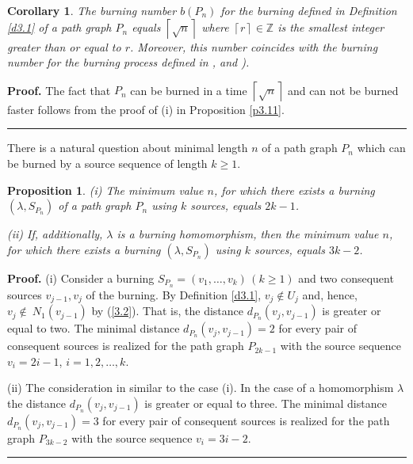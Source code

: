 \documentclass[a4paper, 11pt]{article}
\newtheorem{proposition}[theorem]{Proposition}
\newtheorem{corollary}[theorem]{Corollary}
\newenvironment{proof}[1][Proof]{\textbf{#1.} }{\ \rule{0.5em}{0.5em}}
\newcommand{\ceil}[1]{\left \lceil{#1}\right \rceil}
\begin{document}
\begin{corollary}\label{c3.13}  The burning number  $b(P_n)$ for the burning defined in Definition \ref{d3.1} of a path graph $P_n$ equals $\ceil{\sqrt n}$ where  $\ceil{r}\in \mathbb Z$ is  the smallest integer greater than or equal to  $r$. Moreover, this number coincides with the burning number  for the burning process defined in \cite{Burning_2014}, \cite[Th. 2.9]{Bonato_0} and \cite{Bonato}).
\end{corollary}

\begin{proof} The fact  that $P_n$ can be burned in a time $\ceil{\sqrt n}$ and can not be burned faster follows from the proof of (i) in Proposition \ref{p3.11}. 
\end{proof}



There is  a natural question about minimal length $n$ of a path graph $P_n$ which  can be burned   by a source sequence of length $k\geq1$. 


\begin{proposition}\label{p3.14}  {\rm (i) } The minimum value $n$, for which there exists a burning $(\lambda, S_{P_n})$ of a path graph 
   $P_n$  using $k$ sources, equals  $2k-1$.   

{\rm (ii)} If, additionally, $\lambda$  is a burning homomorphism, then the  minimum  value $n$, for which there exists a  burning $(\lambda, S_{P_n})$    using $k$ sources, equals  $3k-2$.  
\end{proposition}

\begin{proof} (i)  Consider a burning $S_{P_n}=(v_1, \dots, v_k)\, (k\geq 1) $ and two consequent sources  $v_{j-1}, v_{j}$ of the burning. By Definition \ref{d3.1},  $v_j\notin U_j$ and, hence,  $v_j\notin~N_1(v_{j-1})$ by (\ref{3.2}). That is, the distance 
$d_{P_n}(v_j,v_{j-1})$ is greater or equal to two.   The minimal distance $d_{P_n}(v_j,v_{j-1})=2$ for every pair of consequent sources  is realized for the path graph $P_{2k-1}$ with the source sequence $v_i=2i-1$, $i=1,2,\dots, k$. 

(ii)  The consideration in similar to the case (i). In the case of a homomorphism $\lambda$ the distance 
$d_{P_n}(v_j,v_{j-1})$ is greater or equal to three. The minimal distance $d_{P_n}(v_j,v_{j-1})=3$ for every pair of consequent sources  is realized for the path graph $P_{3k-2}$ with the source sequence $v_i=3i-2$.
\end{proof}
\end{document}
